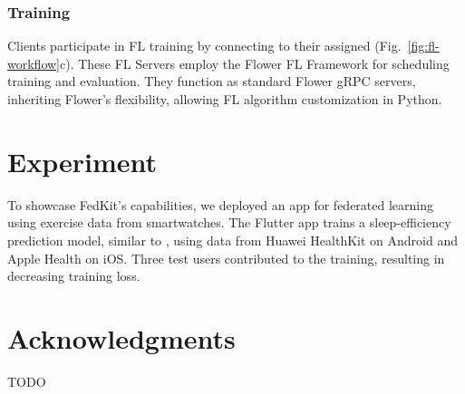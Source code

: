 \documentclass[letterpaper]{article} %
\begin{document}
\subsubsection{Training}
Clients participate in FL training by connecting to their assigned \fs{}
(Fig.~\ref{fig:fl-workflow}c).
These FL Servers employ the Flower FL Framework for
scheduling training and evaluation.
They function as standard Flower gRPC servers,
inheriting Flower's flexibility,
allowing FL algorithm customization in Python.

\section{Experiment}
To showcase FedKit's capabilities,
we deployed an app for federated learning using exercise data from smartwatches.
The Flutter app trains a sleep-efficiency prediction model,
similar to \cite{khoa2022fedmcrnn},
using data from Huawei HealthKit on Android and Apple Health on iOS.
Three test users contributed to the training,
resulting in decreasing training loss.

\appendix

\section*{Acknowledgments}
TODO

\bigskip


\end{document}
